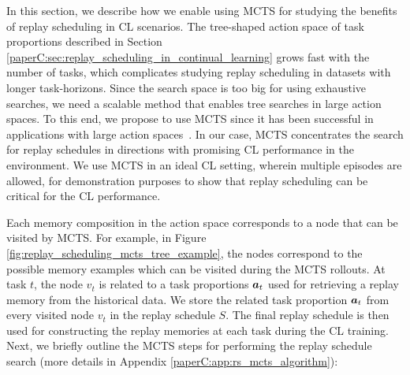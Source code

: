 In this section, we describe how we enable using MCTS for studying the benefits of replay scheduling in CL scenarios.
The tree-shaped action space of task proportions described in Section \ref{paperC:sec:replay_scheduling_in_continual_learning} grows fast with the number of tasks, which complicates studying replay scheduling in datasets with longer task-horizons. Since the search space is too big for using exhaustive searches, 
we need a scalable method that enables tree searches in large action spaces.
To this end, we propose to use MCTS since it has been successful in applications with large action spaces~. In our case, MCTS concentrates the search for replay schedules in directions with promising CL performance in the environment. We use MCTS in an ideal CL setting, wherein multiple episodes are allowed, for demonstration purposes to show that replay scheduling can be critical for the CL performance. 

Each memory composition in the action space corresponds to a node that can be visited by MCTS. For example, in Figure \ref{fig:replay_scheduling_mcts_tree_example}, the nodes correspond to the possible memory examples which can be visited during the MCTS rollouts.
At task $t$, the node $v_t$ is related to a task proportions ${\bm{a}}_{t}$ used for retrieving a replay memory from the historical data. 
We store the related task proportion ${\bm{a}}_t$ from every visited node $v_t$ in the replay schedule $S$. 
The final replay schedule is then used for constructing the replay memories at each task during the CL training.  
Next, we briefly outline the MCTS steps for performing the replay schedule search (more details in Appendix \ref{paperC:app:rs_mcts_algorithm}):


